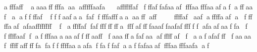   afffaffaaaafffffaaaafffffaafaaffffffaffffaffafaaaffffaafffaaafafaffaafaaffffaffffaafaafafffffafffaaaaffaffffffafaafaffffaafafffffaafafaafffffffffaffffaffaffffffffafffaffffaaaffaafaffffffafaafaaffaffffffaaffaffffaaaaaaffffaafffaaaffafafaaafffffaffaafafaffffaaaafffffafffffafaffffffaaaafaffaffafaaffafaaaffffaafffaafaaf